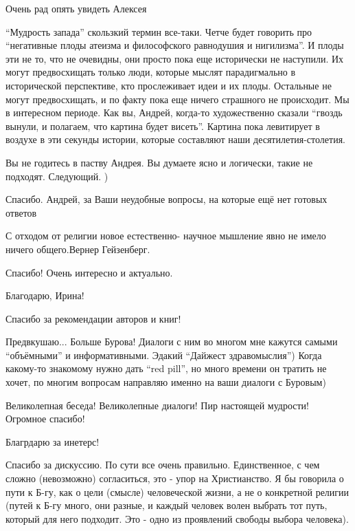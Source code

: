 \begin{multicols}{2}
Очень рад опять увидеть Алексея


\enquote{Мудрость запада} скользкий термин все-таки. Четче будет говорить про
\enquote{негативные плоды атеизма и философского равнодушия и нигилизма}. И плоды эти
не то, что не очевидны, они просто пока еще исторически не наступили. Их могут
предвосхищать только люди, которые мыслят парадигмально в исторической
перспективе, кто прослеживает идеи и их плоды. Остальные не могут
предвосхищать, и по факту пока еще ничего страшного не происходит. Мы в
интересном периоде. Как вы, Андрей, когда-то художественно сказали \enquote{гвоздь
вынули, и полагаем, что картина будет висеть}. Картина пока левитирует в
воздухе в эти секунды истории, которые составляют наши десятилетия-столетия.

Вы не годитесь в паству Андрея. Вы думаете ясно и логически, такие не подходят. Следующий. )


Спасибо. Андрей,
за Ваши неудобные вопросы, на которые ещё нет готовых ответов


С отходом от религии новое естественно- научное мышление явно  не имело ничего
общего.Вернер Гейзенберг.


Спасибо! Очень интересно и актуально.

Благодарю, Ирина!

Спасибо за рекомендации авторов и книг!


Предвкушаю...
Больше Бурова! Диалоги с ним во многом мне кажутся самыми \enquote{объёмными} и информативными.
Эдакий \enquote{Дайжест здравомыслия})
Когда какому-то знакомому нужно дать \enquote{red pill}, но много времени он тратить не хочет, по многим вопросам направляю именно на ваши диалоги с Буровым)

Великолепная беседа! Великолепные диалоги! Пир настоящей мудрости! Огромное спасибо!

Благрдарю за инетерс!


Спасибо за дискуссию. По сути все очень правильно. Единственное, с чем сложно
(невозможно) согласиться, это - упор на Христианство. Я бы говорила о пути к
Б-гу, как о цели (смысле) человеческой жизни, а не о конкретной религии (путей
к Б-гу много, они разные, и каждый человек волен выбрать тот путь, который для
него подходит. Это - одно из проявлений свободы выбора человека).


\end{multicols}
